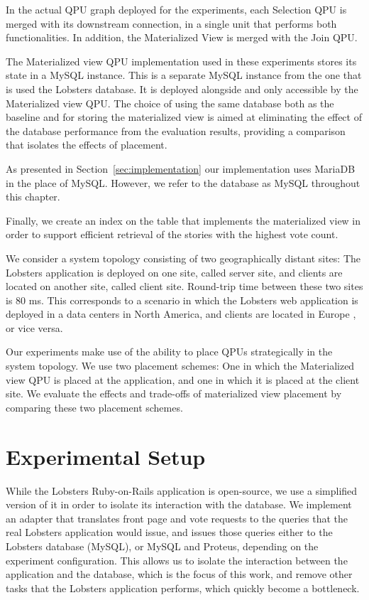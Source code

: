 In the actual QPU graph deployed for the experiments, each Selection QPU is merged with its downstream connection,
in a single unit that performs both functionalities.
In addition, the Materialized View is merged with the Join QPU.

The Materialized view QPU implementation used in these experiments stores its state in a MySQL instance.
This is a separate MySQL instance from the one that is used the Lobsters database.
It is deployed alongside and only accessible by the Materialized view QPU.
The choice of using the same database both as the baseline and for storing the materialized view is aimed at eliminating
the effect of the database performance from the evaluation results,
providing a comparison that isolates the effects of placement.

As presented in Section~\ref{sec:implementation} our implementation uses MariaDB in the place of MySQL.
However, we refer to the database as MySQL throughout this chapter.

Finally, we create an index on the table that implements the materialized view in order to support efficient retrieval of
the stories with the highest vote count.

\bigskip
\noindent
We consider a system topology consisting of two geographically distant sites:
The Lobsters application is deployed on one site, called server site,
and clients are located on another site, called client site.
Round-trip time between these two sites is 80 ms.
This corresponds to a scenario in which the Lobsters web application is deployed in a data centers in North America,
and clients are located in Europe \cite{pbailis:hats}, or vice versa.

Our experiments  make use of the ability to place QPUs strategically in the system topology.
We use two placement schemes:
One in which the Materialized view QPU is placed at the application, and one in which it is placed at
the client site.
We evaluate the effects and trade-offs of materialized view placement by comparing these two placement schemes.


\section{Experimental Setup}

While the Lobsters Ruby-on-Rails application is open-source,
we use a simplified version of it in order to isolate its interaction with the database.
We implement an adapter that translates front page and vote requests to the queries that the real
Lobsters application would issue, and issues those queries either to the Lobsters database (MySQL),
or MySQL and Proteus, depending on the experiment configuration.
This allows us to isolate the interaction between the application and the database, which is the focus of this work,
and remove other tasks that the Lobsters application performs, which quickly become a bottleneck.

